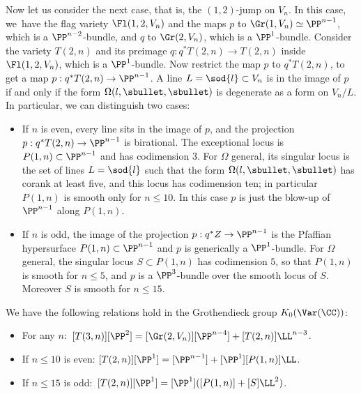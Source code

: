 Now let us consider the next case, that is, the $(1,2)$-jump on $V_n$. In this case, we~have the flag variety $\Fl(1,2,V_n)$ and the maps $p$ to $\Gr(1,V_n)\simeq \PP^{n-1}$, which is a $\PP^{n-2}$-bundle, and $q$ to $\Gr(2,V_n)$, which is a $\PP^1$-bundle. Consider the variety $T(2,n)$ and its preimage $q: q^*T(2,n) \to T(2,n)$ inside $\Fl(1,2,V_n)$, which is a $\PP^1$-bundle. Now restrict the map $p$ to $q^*T(2,n)$, to get a map $p: q^*T(2,n) \to \PP^{n-1}$. A line $L = \sod{l} \subset V_n$ is in the image of $p$ if and only if the form $\Omega(l,\sbullet,\sbullet)$ is degenerate as a form on $V_n/L$. In particular, we can distinguish two cases:

\begin{itemize}
\item If $n$ is even, every line sits in the image of $p$, and the projection $p: q^*T(2,n) \to \PP^{n-1}$ is birational. The exceptional locus is $P(1,n) \subset \PP^{n-1}$ and has codimension $3$. For $\Omega$ general, its singular locus is the set of lines $L = \sod{l}$ such that
the form $\Omega(l,\sbullet,\sbullet)$ has corank at least five, and this locus has codimension ten; in particular $P(1,n)$ is smooth only for $n\le 10$. In this case $p$ is just the blow-up of $\PP^{n-1}$ along $P(1,n)$.
\item If $n$ is odd, the image of the projection $p: q^*Z \to \PP^{n-1}$ is the Pfaffian
hypersurface $P(1,n) \subset \PP^{n-1}$ and $p$ is generically a $\PP^1$-bundle.
For $\Omega$ general, the singular locus $S \subset P(1,n)$ has codimension $5$, so
that $P(1,n)$ is smooth for $n \leq 5$, and $p$ is a $\PP^3$-bundle over the smooth
locus of $S$. Moreover $S$ is smooth for $n\le 15$.
\end{itemize}

\begin{prop}\label{prop:jump-T2-to-T3}
We have the following relations hold in the Grothendieck group $K_0(\Var(\CC))$:\vspace*{-3pt}
\begin{itemize}
\item For any $n$:\qquad\quad\;\,
$[T(3,n)][\PP^2]=[\Gr(2,V_n)][\PP^{n-4}]+[T(2,n)]\LL^{n-3}$.

\item If $n\le 10$ is even:\quad
$[T(2,n)][\PP^1]=[\PP^{n-1}]+[\PP^1][P(1,n)]\LL$.

\item If $n\le 15$ is odd:\quad\,
$[T(2,n)][\PP^1]=[\PP^1]([P(1,n)]+[S]\LL^2)$.
\end{itemize}
\end{prop}

